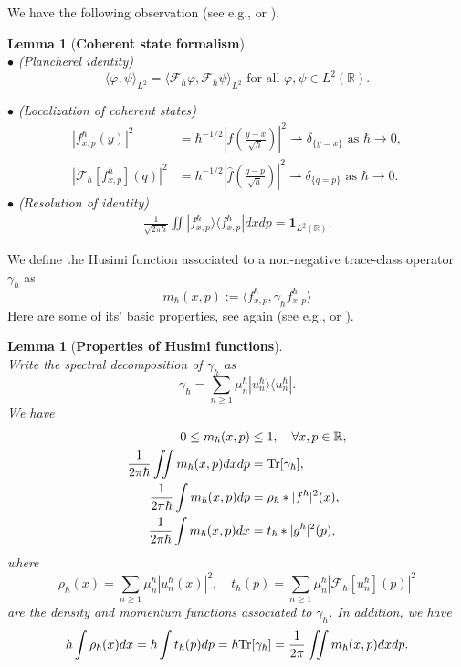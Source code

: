 \documentclass[%
11pt,  reqno]{amsart}
\newtheorem{lemma}[theorem]{Lemma}
\theoremstyle{remarkstyle}
\newcommand{\1}{\hspace{0.2mm}\text{I}\hspace{0.2mm}}
\newcommand{\R}{\mathbb{R}}
\newcommand{\jb}[1]
{\langle #1 \rangle}
\newcommand{\ind}{\mathbf 1}
\numberwithin{equation}{section}
\numberwithin{theorem}{section}
\begin{document}
	We have the following observation (see e.g., \cite[Chapter 12]{LL01} or \cite[Section 2.1]{FLS18}).
	\begin{lemma}[\textbf{Coherent state formalism}]\label{lem:coherent}\mbox{}\\
		\noindent$\bullet$ (Plancherel identity)
		$$
		\jb{\varphi, \psi}_{L^2} = \jb{\mathcal F_{\hbar}\varphi, \mathcal F_{\hbar}\psi}_{L^2} \text{ for all } \varphi, \psi \in L^2(\R).
		$$
		
		
		\noindent$\bullet$ (Localization of coherent states)
		\begin{align*}
			|f^{\hbar}_{x,p}(y)|^2 &= \hbar^{-1/2}\left|f\left(\frac{y-x}{\sqrt{\hbar}}\right)\right|^2 \rightharpoonup \delta_{\{y=x\}} \text{ as } \hbar \to 0, \\
			|\mathcal F_{\hbar}[f^{\hbar}_{x,p}](q)|^2 &= h^{-1/2}\left|\hat{f}\left(\frac{q-p}{\sqrt{\hbar}}\right)\right|^2 \rightharpoonup \delta_{\{q=p\}} \text{ as } \hbar \to 0.			
		\end{align*}
		\noindent$\bullet$ (Resolution of identity)
		\begin{align} \label{reso-iden}
			\frac{1}{\sqrt{2\pi \hbar}} \iint |f^{\hbar}_{x,p}\rangle \langle f^{\hbar}_{x,p}| dx dp = \ind_{L^2(\R)}.
		\end{align}
	\end{lemma}
	
	We define the Husimi function associated to a non-negative trace-class operator $\gamma_{\hbar}$ as
	\[
	m_{\hbar}(x,p) := \jb{f^{\hbar}_{x,p}, \gamma_{\hbar}f^{\hbar}_{x,p}}
	\]
	Here are some of its' basic properties, see again (see e.g., \cite[Chapter 12]{LL01} or \cite[Section 2.1]{FLS18}).
	
	\begin{lemma}[\textbf{Properties of Husimi functions}]\label{lem:Husimi}\mbox{}\\
		Write the spectral decomposition of $\gamma_{\hbar}$ as 
		$$ \gamma_\hbar = \sum_{n\geq 1} \mu_n^{\hbar} |u^{\hbar}_n \rangle \langle u^{\hbar}_n|.$$
		We have 
		\begin{align*}
			0\leq m_{\hbar}(x,p) &\leq 1, \quad \forall x,p \in \R, \\
			\frac{1}{2\pi\hbar}\iint m_{\hbar}(x,p) dxdp &= {\rm Tr}[\gamma_\hbar], \\
			\frac{1}{2\pi\hbar} \int m_{\hbar}(x,p) dp &= \rho_{\hbar} \ast |f^{\hbar}|^2 (x), \\
			\frac{1}{2\pi\hbar} \int m_{\hbar}(x,p) dx &= t_{\hbar} \ast |g^{\hbar}|^2(p),
		\end{align*}
		where 
		\[
		\rho_{\hbar}(x) = \sum_{n\geq 1} \mu_n^{\hbar} |u^{\hbar}_n(x)|^2, \quad t_{\hbar}(p) = \sum_{n\geq 1} \mu_n^{\hbar} |\mathcal F_{\hbar}[u^{\hbar}_n](p)|^2
		\]
		are the density and momentum functions associated to $\gamma_{\hbar}$. In addition, we have
		\begin{align}\label{momen-densi-relation}
			\hbar \int \rho_\hbar(x) dx = \hbar \int t_{\hbar}(p) dp = \hbar {\rm Tr}[\gamma_\hbar] = \frac{1}{2\pi}\iint m_{\hbar}(x,p)dxdp.
		\end{align}
	\end{lemma}
	
\end{document}

